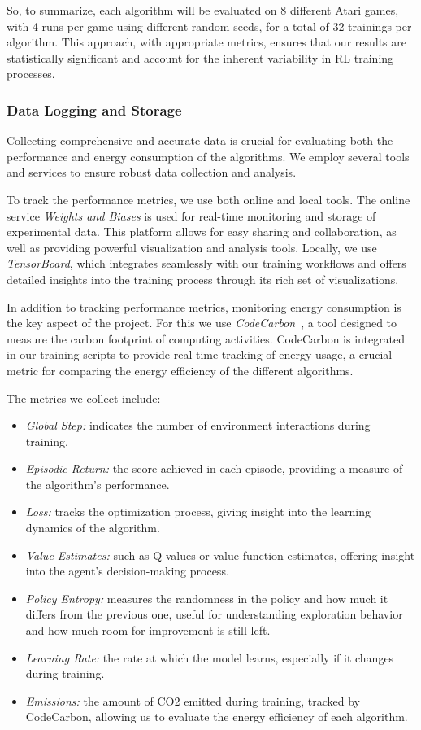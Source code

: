 So, to summarize, each algorithm will be evaluated on 8 different Atari games, with 4 runs per game using different random seeds, for a total of 32 trainings per algorithm. This approach, with appropriate metrics, ensures that our results are statistically significant and account for the inherent variability in RL training processes.

\subsubsection{Data Logging and Storage}
\label{subsubsec:data_collection}

Collecting comprehensive and accurate data is crucial for evaluating both the performance and energy consumption of the algorithms. We employ several tools and services to ensure robust data collection and analysis.

To track the performance metrics, we use both online and local tools. The online service \textit{Weights and Biases} is used for real-time monitoring and storage of experimental data. This platform allows for easy sharing and collaboration, as well as providing powerful visualization and analysis tools. Locally, we use \textit{TensorBoard}, which integrates seamlessly with our training workflows and offers detailed insights into the training process through its rich set of visualizations.

In addition to tracking performance metrics, monitoring energy consumption is the key aspect of the project. For this we use \textit{CodeCarbon}~\cite{benoit:code_carbon}, a tool designed to measure the carbon footprint of computing activities. CodeCarbon is integrated in our training scripts to provide real-time tracking of energy usage, a crucial metric for comparing the energy efficiency of the different algorithms.

The metrics we collect include:
\begin{itemize}
	\item \textit{Global Step:} indicates the number of environment interactions during training.
	\item \textit{Episodic Return:} the score achieved in each episode, providing a measure of the algorithm's performance.
	\item \textit{Loss:} tracks the optimization process, giving insight into the learning dynamics of the algorithm.
	\item \textit{Value Estimates:} such as Q-values or value function estimates, offering insight into the agent's decision-making process.
	\item \textit{Policy Entropy:} measures the randomness in the policy and how much it differs from the previous one, useful for understanding exploration behavior and how much room for improvement is still left.
	\item \textit{Learning Rate:} the rate at which the model learns, especially if it changes during training.
	\item \textit{Emissions:} the amount of CO2 emitted during training, tracked by CodeCarbon, allowing us to evaluate the energy efficiency of each algorithm.
\end{itemize}


